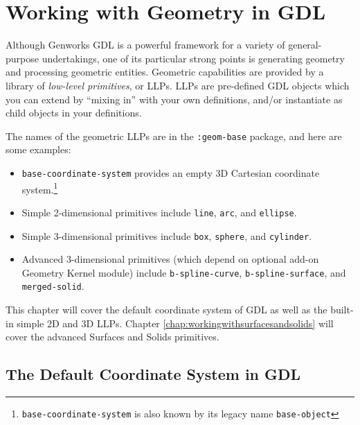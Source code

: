 \documentclass [11pt]{book}
\begin{document}
\chapter{Working with Geometry in GDL}

\label{chap:workingwithgeometryingdl}



Although Genworks GDL is a powerful framework for a variety
  of general-purpose undertakings, one of its particular strong points
  is generating geometry and processing geometric entities. Geometric
  capabilities are provided by a library of \emph{low-level primitives}, or LLPs. LLPs are pre-defined GDL objects which you can
	extend by ``mixing in'' with your own definitions, and/or
	instantiate as child objects in your definitions.



The names of the geometric LLPs are in the \texttt{:geom-base} package, and here are some examples:

\begin{itemize}

\item \texttt{base-coordinate-system} provides an empty 3D Cartesian coordinate system.\footnote{\texttt{base-coordinate-system} is also known by its legacy name \texttt{base-object}}

\item Simple 2-dimensional primitives include \texttt{line}, \texttt{arc}, and \texttt{ellipse}.

\item Simple 3-dimensional primitives include \texttt{box}, \texttt{sphere}, and \texttt{cylinder}.

\item Advanced 3-dimensional primitives (which depend on optional add-on Geometry Kernel module) include \texttt{b-spline-curve}, \texttt{b-spline-surface}, and \texttt{merged-solid}.

\end{itemize}

This chapter will cover the default coordinate system of GDL as well as the built-in simple 2D and 3D LLPs. Chapter 
\ref{chap:workingwithsurfacesandsolids} will cover the advanced Surfaces and Solids primitives.



\section{The Default Coordinate System in GDL}
\end{document}
